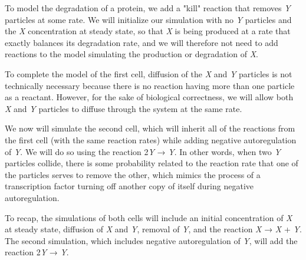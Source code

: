 To model the degradation of a protein, we add a "kill" reaction that removes \textit{Y} particles at some rate. We will initialize our simulation with no \textit{Y} particles and the \textit{X} concentration at steady state, so that \textit{X} is being produced at a rate that exactly balances its degradation rate, and we will therefore not need to add reactions to the model simulating the production or degradation of \textit{X}.

To complete the model of the first cell, diffusion of the \textit{X} and \textit{Y} particles is not technically necessary because there is no reaction having more than one particle as a reactant. However, for the sake of biological correctness, we will allow both \textit{X} and \textit{Y} particles to diffuse through the system at the same rate.

\begin{qbox}\end{qbox} 

We now will simulate the second cell, which will inherit all of the reactions from the first cell (with the same reaction rates) while adding negative autoregulation of \textit{Y}. We will do so using the reaction 2\textit{Y} → \textit{Y}. In other words, when two \textit{Y} particles collide, there is some probability related to the reaction rate that one of the particles serves to remove the other, which mimics the process of a transcription factor turning off another copy of itself during negative autoregulation.

To recap, the simulations of both cells will include an initial concentration of \textit{X} at steady state, diffusion of \textit{X} and \textit{Y}, removal of \textit{Y}, and the reaction \textit{X} → \textit{X} + \textit{Y}. The second simulation, which includes negative autoregulation of \textit{Y}, will add the reaction 2\textit{Y} → \textit{Y}. 

\begin{note}\end{note} 

